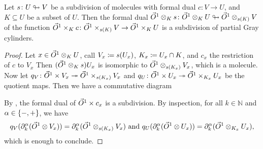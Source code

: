 \begin{lem} \label{lem:subdivision_of_unitors}
    Let \( s \colon U \looparrowright V \) be a subdivision of molecules with formal dual \( c \colon V \to U \), and \( K \subseteq U \) be a subset of \( U \).
    Then the formal dual \( \vec{O}^{1} \otimes_K s \colon \vec{O}^{1} \otimes_K U \looparrowright \vec{O}^{1} \otimes_{s(K)} V \) of the function \( \vec{O}^{1} \times_K c \colon \vec{O}^{1} \times_{s(K)} V \to \vec{O}^{1} \times_K U \) is a subdivision of partial Gray cylinders.
\end{lem}
\begin{proof}
    Let \( x \in \vec{O}^{1} \otimes_K U \), call \( V_x \coloneqq s({U}_{x}) \), \( K_x \coloneqq {U}_{x} \cap K \), and \( c_x \) the restriction of \( c \) to \( V_x \)
    Then \( (\vec{O}^{1} \otimes_K s){U}_{x} \) is isomorphic to \( \vec{O}^{1} \otimes_{s(K_x)} V_x \), which is a molecule.
    Now let \( q_V \colon \vec{O}^{1} \times V_x \twoheadrightarrow \vec{O}^{1} \times_{s(K_x)} V_x  \) and \( q_U \colon \vec{O}^{1} \times {U}_{x} \twoheadrightarrow \vec{O}^{1} \times_{K_x} {U}_{x} \) be the quotient maps.
    Then we have a commutative diagram
    \begin{center}
    \end{center}
    By \cite[Proposition 7.2.21]{hadzihasanovic2024combinatorics}, the formal dual of \( \vec{O}^{1} \times c_x \) is a subdivision.
    By inspection, for all \( k \in \mathbb{N} \) and \( \alpha \in \left\{ {-, +} \right\} \), we have
    \begin{equation*}
        q_V(\partial_{k}^{\alpha} (\vec{O}^{1} \otimes V_x)) = \partial_{k}^{\alpha} (\vec{O}^{1} \otimes_{s(K_x)} V_x) \text{ and } q_U(\partial_{k}^{\alpha} (\vec{O}^{1} \otimes {U}_{x})) = \partial_{k}^{\alpha} (\vec{O}^{1} \otimes_{K_x} {U}_{x}),
    \end{equation*}
    which is enough to conclude. 
\end{proof}

